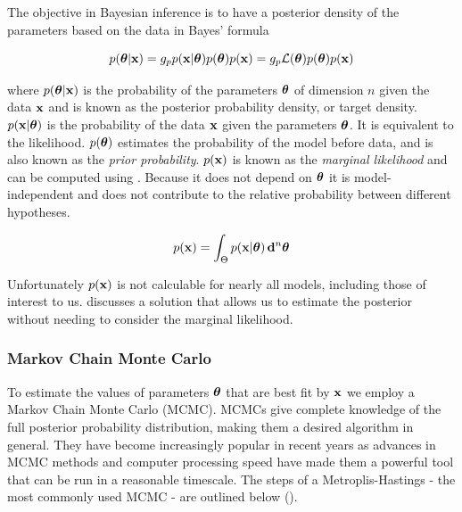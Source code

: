The objective in Bayesian inference is to have a posterior density of the parameters based on the data in Bayes' formula

\begin{equation}
p(\boldsymbol{\theta}|\mathbf{x}) = g_p{p(\mathbf{x}|\boldsymbol{\theta})
p(\boldsymbol{\theta})}{p(\mathbf{x})} = g_p{\mathcal{L}(\boldsymbol{\theta})
p(\boldsymbol{\theta})}{p(\mathbf{x})}
\end{equation}

\noindent where $p(\boldsymbol{\theta}|\mathbf{x})$ is the probability of the parameters $\boldsymbol{\theta}$ of dimension $n$ given the
data $\mathbf{x}$ and is known as the posterior probability density, or target
density.  $p(\mathbf{x}|\boldsymbol{\theta})$ is the probability of the data $\mathbf{x}$ given the parameters
$\boldsymbol{\theta}$.  It is equivalent to the likelihood.  $p(\boldsymbol{\theta})$ estimates the probability of the
model before data, and is also known as the \textit{prior probability}.  $p(\mathbf{x})$ is known as the \textit{marginal likelihood}
and can be computed using .  Because it does not depend on
$\boldsymbol{\theta}$ it is model-independent and does not contribute to the relative probability between different
hypotheses.

\begin{equation}
p(\mathbf{x}) = \int_{\Theta} p(\mathbf{x}|\boldsymbol{\theta})\, \mathbf{d}^n \boldsymbol{\theta}
\label{eq:er_nr_calibrations_parameter_determ_mc_match_p_data}
\end{equation}

Unfortunately $p(\mathbf{x})$ is not calculable for nearly all models, including those of interest to
us.   discusses a solution that allows us to estimate the posterior without
needing to consider the marginal likelihood.



\subsubsection{Markov Chain Monte Carlo}
\label{subsubsec:er_nr_calibrations_parameter_determ_mcmc}
To estimate the values of parameters $\boldsymbol{\theta}$ that are best fit by $\mathbf{x}$ we employ a Markov Chain
Monte Carlo (MCMC).  MCMCs give complete knowledge of the full posterior probability distribution, making them a desired algorithm in
general.  They have become increasingly popular in recent years as advances in MCMC methods and computer processing speed have made them a
powerful tool that can be run in a reasonable timescale.  The steps of a Metroplis-Hastings - the most commonly used MCMC - are outlined
below ().


